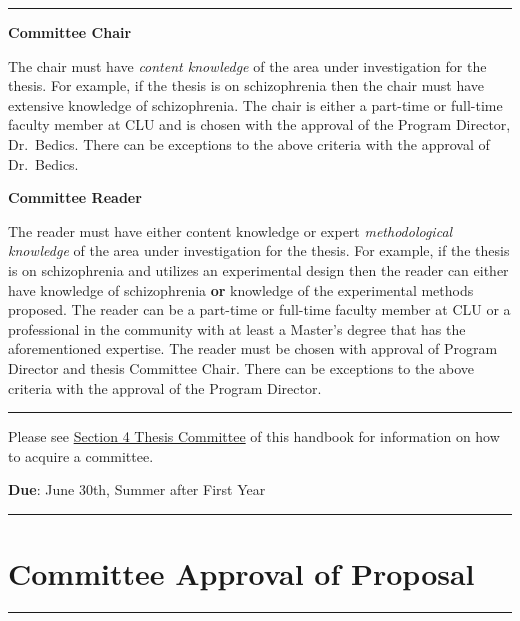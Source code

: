 \documentclass[openany]{book}
\begin{document}
\begin{center}\rule{0.5\linewidth}{0.5pt}\end{center}

\textbf{Committee Chair}

The chair must have \emph{content knowledge} of the area under investigation for the thesis. For example, if the thesis is on schizophrenia then the chair must have extensive knowledge of schizophrenia. The chair is either a part-time or full-time faculty member at CLU and is chosen with the approval of the Program Director, Dr.~Bedics. There can be exceptions to the above criteria with the approval of Dr.~Bedics.

\textbf{Committee Reader}

The reader must have either content knowledge or expert \emph{methodological knowledge} of the area under investigation for the thesis. For example, if the thesis is on schizophrenia and utilizes an experimental design then the reader can either have knowledge of schizophrenia \textbf{or} knowledge of the experimental methods proposed. The reader can be a part-time or full-time faculty member at CLU or a professional in the community with at least a Master's degree that has the aforementioned expertise. The reader must be chosen with approval of Program Director and thesis Committee Chair. There can be exceptions to the above criteria with the approval of the Program Director.

\begin{center}\rule{0.5\linewidth}{0.5pt}\end{center}

Please see \protect\hyperlink{people}{Section 4 Thesis Committee} of this handbook for information on how to acquire a committee.

\textbf{Due}: June 30th, Summer after First Year

\begin{center}\rule{0.5\linewidth}{0.5pt}\end{center}

\hypertarget{committee-approval-of-proposal}{%
\section{Committee Approval of Proposal}\label{committee-approval-of-proposal}}

\begin{center}\rule{0.5\linewidth}{0.5pt}\end{center}
\end{document}
